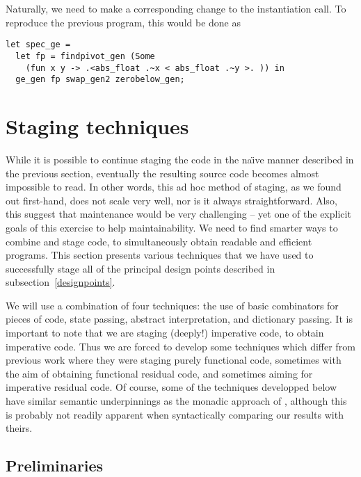 \documentclass[11pt]{elsart}
\begin{document}
Naturally, we need to make a corresponding change to the instantiation
call.  To reproduce the previous program, this would be done as
\begin{small}
\begin{verbatim}
let spec_ge = 
  let fp = findpivot_gen (Some 
    (fun x y -> .<abs_float .~x < abs_float .~y >. )) in
  ge_gen fp swap_gen2 zerobelow_gen;
\end{verbatim}
\end{small}

\section{Staging techniques}
\label{techniques}

While it is possible to continue staging the code in the na\"{\i}ve
manner described in the previous section, eventually the resulting
source code becomes almost impossible to read.  In other words, this ad hoc
method of staging, as we found out first-hand, does not scale very
well, nor is it always straightforward.
Also, this suggest that 
maintenance would be very challenging -- yet one of the
explicit goals of this exercise to help maintainability.  We need to
find smarter ways to combine and stage code, to simultaneously obtain
readable and efficient programs.  This section presents various
techniques that we have used to successfully stage all of the 
principal design points described in subsection~\ref{designpoints}.

We will use a combination of four techniques: the use of basic
combinators for pieces of code, state passing, abstract interpretation, and 
dictionary passing.  It is important to note that we are staging
(deeply!) imperative code, to obtain imperative code.  Thus we are forced
to develop some techniques which differ from previous work
\cite{TahaThesis,KiselyovTaha} where they were staging purely functional code,
sometimes with the aim of obtaining functional residual code, and sometimes
aiming for imperative residual code.  Of course, some of the techniques
developped below have similar semantic underpinnings as the monadic
approach of \cite{KiselyovTaha}, although this is probably not 
readily apparent when syntactically comparing our results with theirs.

\subsection{Preliminaries}\label{prelim}
\end{document}
